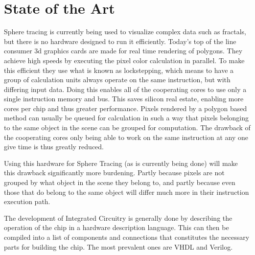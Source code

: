 \chapter{State of the Art}

Sphere tracing is currently being used to visualize complex data such as 
fractals, but there is no hardware designed to run it efficiently. Today's top 
of the line consumer 3d graphics cards are made for real time rendering of 
polygons. They achieve high speeds by executing the pixel color calculation in 
parallel. To make this efficient they use what is known as lockstepping, which 
means to have a group of calculation units always operate on the same 
instruction, but with differing input data. Doing this enables all of the 
cooperating cores to use only a single instruction memory and bus. This saves 
silicon real estate, enabling more cores per chip and thus greater performance. 
Pixels rendered by a polygon based method can usually be queued for calculation 
in such a way that pixels belonging to the same object in the scene can be 
grouped for computation. The drawback of the cooperating cores only being able 
to work on the same instruction at any one give time is thus greatly reduced.

Using this hardware for Sphere Tracing (as is currently being done) will make 
this drawback significantly more burdening. Partly because pixels are not 
grouped by what object in the scene they belong to, and partly because even 
those that do belong to the same object will differ much more in their 
instruction execution path.



The development of Integrated Circuitry is generally done by describing the 
operation of the chip in a hardware description language. This can then be 
compiled into a list of components and connections that constitutes the 
necessary parts for building the chip. The most prevalent ones are VHDL and 
Verilog. 
